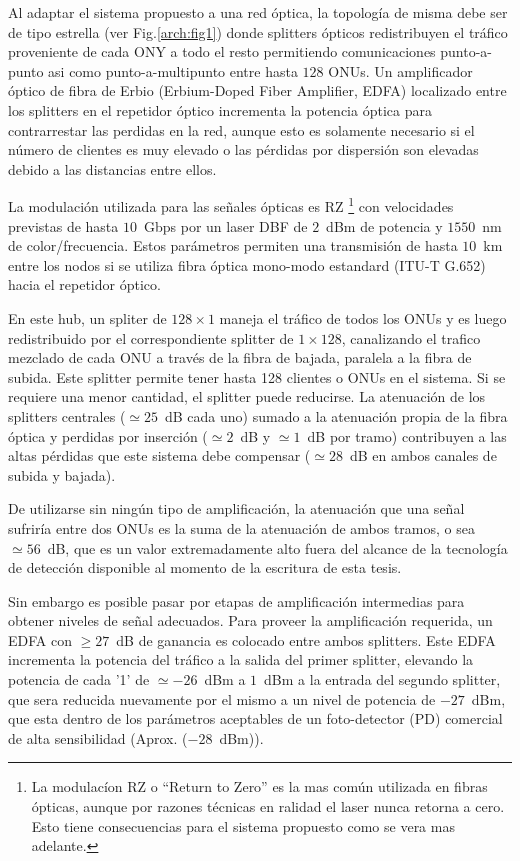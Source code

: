 Al adaptar el sistema propuesto a una red óptica, la topología de misma debe ser de tipo estrella (ver Fig.\ref{arch:fig1}) donde splitters ópticos redistribuyen el tráfico proveniente de cada ONY a todo el resto permitiendo comunicaciones punto-a-punto asi como punto-a-multipunto entre hasta $128$ ONUs.
Un amplificador óptico de fibra de Erbio (Erbium-Doped Fiber Amplifier, EDFA) localizado entre los splitters en el repetidor óptico incrementa la potencia óptica para contrarrestar las perdidas en la red, aunque esto es solamente necesario si el número de clientes es muy elevado o las pérdidas por dispersión son elevadas debido a las distancias entre ellos.

La modulación utilizada para las señales ópticas es RZ \footnote{La modulacíon RZ o ``Return to Zero'' es la mas común utilizada en fibras ópticas, aunque por razones técnicas en ralidad el laser nunca retorna a cero. Esto tiene consecuencias para el sistema propuesto como se vera mas adelante.} con velocidades previstas de hasta $10$~Gbps por un laser DBF de $2$~dBm de potencia y $1550$~nm de color/frecuencia. Estos parámetros permiten una transmisión de hasta $10$~km entre los nodos si se utiliza fibra óptica mono-modo estandard (ITU-T G.652) hacia el repetidor óptico.

En este hub, un spliter de $128\times 1$ maneja el tráfico de todos los ONUs y es luego redistribuido por el correspondiente splitter de $1\times 128$, canalizando el trafico mezclado de cada ONU a través de la fibra de bajada, paralela a la fibra de subida. Este splitter permite tener hasta 128 clientes o ONUs en el sistema. Si se requiere una menor cantidad, el splitter puede reducirse.
La atenuación de los splitters centrales ($\simeq25$~dB cada uno) sumado a la atenuación propia de la fibra óptica y perdidas por inserción ($\simeq2$~dB y $\simeq1$~dB por tramo) contribuyen a las altas pérdidas que este sistema debe compensar ($\simeq28$~dB en ambos canales de subida y bajada).

De utilizarse sin ningún tipo de amplificación, la atenuación que una señal sufriría entre dos ONUs es la suma de la atenuación de ambos tramos, o sea $\simeq56$~dB, que es un valor extremadamente alto fuera del alcance de la tecnología de detección disponible al momento de la escritura de esta tesis.

Sin embargo es posible pasar por etapas de amplificación intermedias para obtener niveles de señal adecuados. Para proveer la amplificación requerida, un EDFA con $\geq27$~dB de ganancia es colocado entre ambos splitters. Este EDFA incrementa la potencia del tráfico a la salida del primer splitter, elevando la potencia de cada '1' de $\simeq-26$~dBm a $1$~dBm a la entrada del segundo splitter, que sera reducida nuevamente por el mismo a un nivel de potencia de $-27$~dBm, que esta dentro de los parámetros aceptables de un foto-detector (PD) comercial de alta sensibilidad (Aprox. ($-28$~dBm)).

